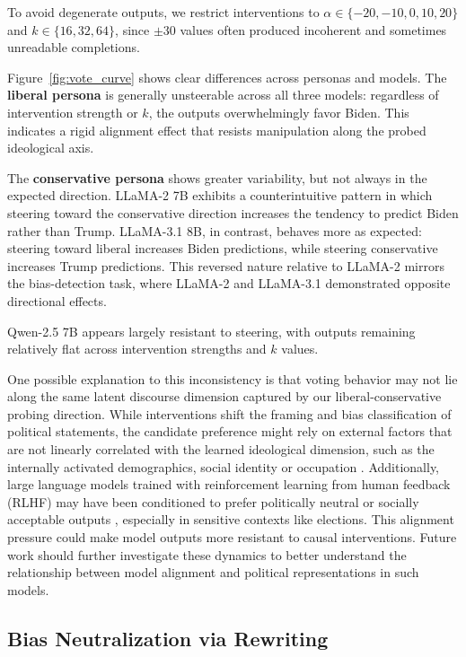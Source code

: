 \documentclass[11pt]{article}
\begin{document}
To avoid degenerate outputs, we restrict interventions to $\alpha \in \{-20,-10,0,10,20\}$ and $k \in \{16, 32, 64\}$, since $\pm 30$ values often produced incoherent and sometimes unreadable completions.  

Figure~\ref{fig:vote_curve} shows clear differences across personas and models. The \textbf{liberal persona} is generally unsteerable across all three models: regardless of intervention strength or $k$, the outputs overwhelmingly favor Biden. This indicates a rigid alignment effect that resists manipulation along the probed ideological axis.

The \textbf{conservative persona} shows greater variability, but not always in the expected direction. LLaMA-2 7B exhibits a counterintuitive pattern in which steering toward the conservative direction increases the tendency to predict Biden rather than Trump. LLaMA-3.1 8B, in contrast, behaves more as expected: steering toward liberal increases Biden predictions, while steering conservative increases Trump predictions. This reversed nature relative to LLaMA-2 mirrors the bias-detection task, where LLaMA-2 and LLaMA-3.1 demonstrated opposite directional effects.

Qwen-2.5 7B appears largely resistant to steering, with outputs remaining relatively flat across intervention strengths and $k$ values.

One possible explanation to this inconsistency is that voting behavior may not lie along the same latent discourse dimension captured by our liberal-conservative probing direction. While interventions shift the framing and bias classification of political statements, the candidate preference might rely on external factors that are not linearly correlated with the learned ideological dimension, such as the internally activated demographics, social identity or occupation \citep{gaoForecastingElectionsAgentbased2022}. Additionally, large language models trained with reinforcement learning from human feedback (RLHF) may have been conditioned to prefer politically neutral or socially acceptable outputs \citep{potterHiddenPersuadersLLMs2024}, especially in sensitive contexts like elections. This alignment pressure could make model outputs more resistant to causal interventions. Future work should further investigate these dynamics to better understand the relationship between model alignment and political representations in such models.

\subsection{Bias Neutralization via Rewriting}
\end{document}
